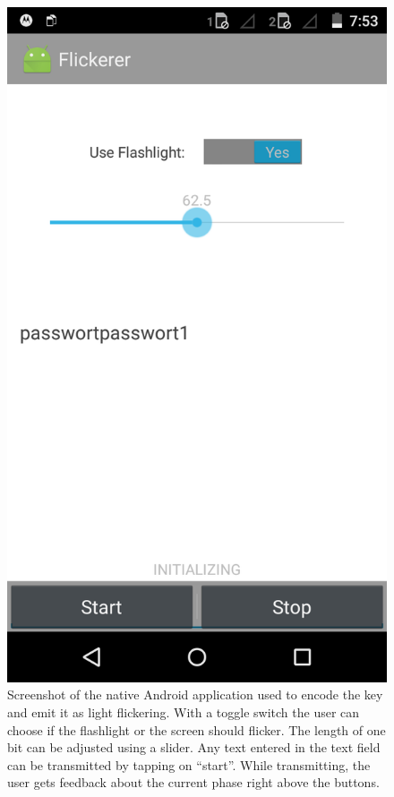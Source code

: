 \documentclass{sig-alternate} %
\begin{document}
\begin{figure}
	\centering
	\includegraphics[scale=.15]{images/screen_native.png}
	\caption{Screenshot of the native Android application used to encode the key and emit it as light flickering. With a toggle switch the user can choose if the flashlight or the screen should flicker. The length of one bit can be adjusted using a slider. Any text entered in the text field can be transmitted by tapping on ``start''. While transmitting, the user gets feedback about the current phase right above the buttons.}
	\label{fig:screenshot}
\end{figure}
\end{document}
